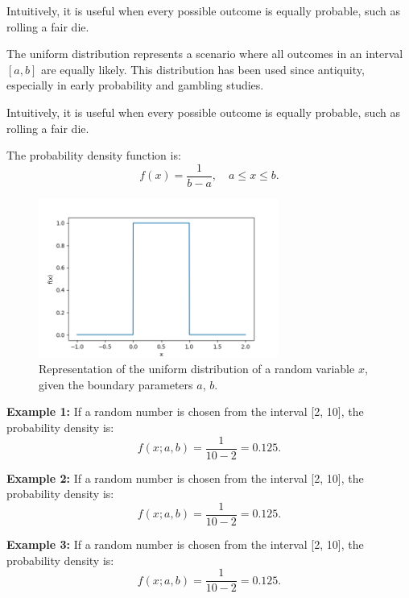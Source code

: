 \documentclass{book}
\begin{document}
Intuitively, it is useful when every possible outcome is equally probable, such as rolling a fair die.

The uniform distribution represents a scenario where all outcomes in an interval $[a, b]$ are equally likely. This distribution has been used since antiquity, especially in early probability and gambling studies.

Intuitively, it is useful when every possible outcome is equally probable, such as rolling a fair die.

The probability density function is:
\begin{equation}
    f(x) = \frac{1}{b-a}, \quad a \leq x \leq b.
\end{equation}

\begin{figure}[ht]
    \centering
    \includegraphics[width=0.7\textwidth]{figures/chapter2/uniform.png}
    \caption{Representation of the uniform distribution of a random variable $x$, given the boundary parameters $a$, $b$.}
    \label{fig:random}
\end{figure}

\textbf{Example 1:} If a random number is chosen from the interval [2, 10], the probability density is:
\begin{equation}
    f(x; a, b) = \frac{1}{10-2} = 0.125.
\end{equation}

\textbf{Example 2:} If a random number is chosen from the interval [2, 10], the probability density is:
\begin{equation}
    f(x; a, b) = \frac{1}{10-2} = 0.125.
\end{equation}

\textbf{Example 3:} If a random number is chosen from the interval [2, 10], the probability density is:
\begin{equation}
    f(x; a, b) = \frac{1}{10-2} = 0.125.
\end{equation}
\end{document}
